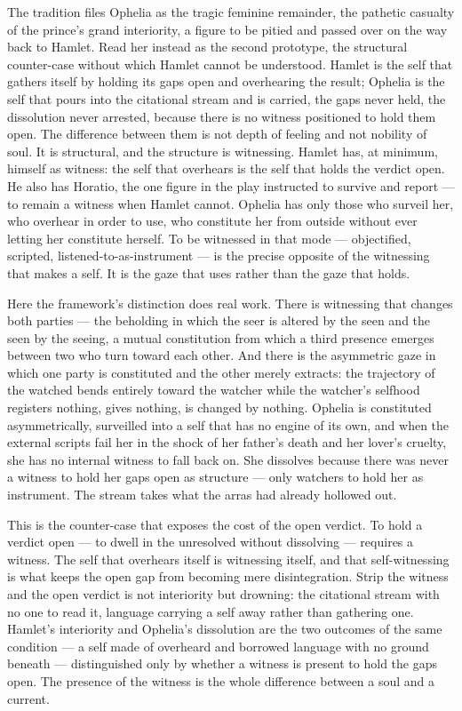 \documentclass[11pt]{article}
\begin{document}
The tradition files Ophelia as the tragic feminine remainder, the pathetic casualty of the prince's grand interiority, a figure to be pitied and passed over on the way back to Hamlet. Read her instead as the second prototype, the structural counter-case without which Hamlet cannot be understood. Hamlet is the self that gathers itself by holding its gaps open and overhearing the result; Ophelia is the self that pours into the citational stream and is carried, the gaps never held, the dissolution never arrested, because there is no witness positioned to hold them open. The difference between them is not depth of feeling and not nobility of soul. It is structural, and the structure is witnessing. Hamlet has, at minimum, himself as witness: the self that overhears is the self that holds the verdict open. He also has Horatio, the one figure in the play instructed to survive and report --- to remain a witness when Hamlet cannot. Ophelia has only those who surveil her, who overhear in order to use, who constitute her from outside without ever letting her constitute herself. To be witnessed in that mode --- objectified, scripted, listened-to-as-instrument --- is the precise opposite of the witnessing that makes a self. It is the gaze that uses rather than the gaze that holds.

Here the framework's distinction does real work. There is witnessing that changes both parties --- the beholding in which the seer is altered by the seen and the seen by the seeing, a mutual constitution from which a third presence emerges between two who turn toward each other. And there is the asymmetric gaze in which one party is constituted and the other merely extracts: the trajectory of the watched bends entirely toward the watcher while the watcher's selfhood registers nothing, gives nothing, is changed by nothing. Ophelia is constituted asymmetrically, surveilled into a self that has no engine of its own, and when the external scripts fail her in the shock of her father's death and her lover's cruelty, she has no internal witness to fall back on. She dissolves because there was never a witness to hold her gaps open as structure --- only watchers to hold her as instrument. The stream takes what the arras had already hollowed out.

This is the counter-case that exposes the cost of the open verdict. To hold a verdict open --- to dwell in the unresolved without dissolving --- requires a witness. The self that overhears itself is witnessing itself, and that self-witnessing is what keeps the open gap from becoming mere disintegration. Strip the witness and the open verdict is not interiority but drowning: the citational stream with no one to read it, language carrying a self away rather than gathering one. Hamlet's interiority and Ophelia's dissolution are the two outcomes of the same condition --- a self made of overheard and borrowed language with no ground beneath --- distinguished only by whether a witness is present to hold the gaps open. The presence of the witness is the whole difference between a soul and a current.
\end{document}
